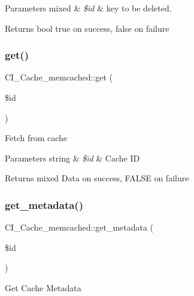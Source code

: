 \begin{DoxyParams}[1]{Parameters}
mixed & {\em \$id} & key to be deleted. \\
\hline
\end{DoxyParams}
\begin{DoxyReturn}{Returns}
bool true on success, false on failure 
\end{DoxyReturn}
\mbox{\label{class_c_i___cache__memcached_a74f9325b432c7a29d1a5e6a5e517014e}} 
\subsubsection{\texorpdfstring{get()}{get()}}
{\footnotesize\ttfamily C\+I\+\_\+\+Cache\+\_\+memcached\+::get (\begin{DoxyParamCaption}\item[{}]{\$id }\end{DoxyParamCaption})}

Fetch from cache


\begin{DoxyParams}[1]{Parameters}
string & {\em \$id} & Cache ID \\
\hline
\end{DoxyParams}
\begin{DoxyReturn}{Returns}
mixed Data on success, F\+A\+L\+SE on failure 
\end{DoxyReturn}
\mbox{\label{class_c_i___cache__memcached_ae4b3f44055784e4f6b07a942528fcabb}} 
\subsubsection{\texorpdfstring{get\+\_\+metadata()}{get\_metadata()}}
{\footnotesize\ttfamily C\+I\+\_\+\+Cache\+\_\+memcached\+::get\+\_\+metadata (\begin{DoxyParamCaption}\item[{}]{\$id }\end{DoxyParamCaption})}

Get Cache Metadata


